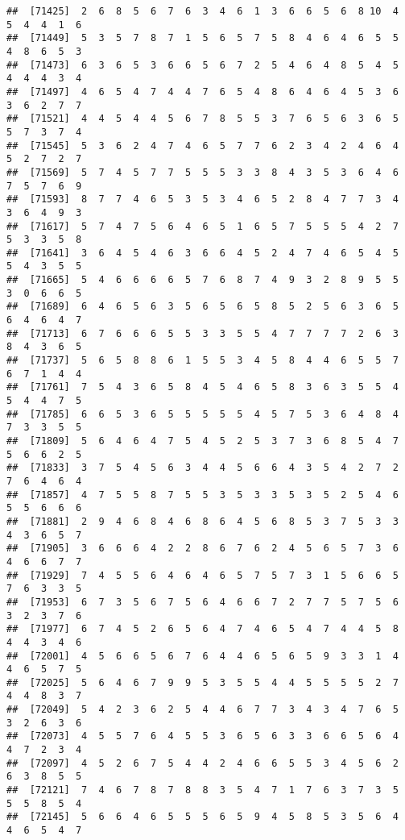 \documentclass[
]{book}
\begin{document}
\begin{verbatim}
##  [71425]  2  6  8  5  6  7  6  3  4  6  1  3  6  6  5  6  8 10  4  5  4  4  1  6
##  [71449]  5  3  5  7  8  7  1  5  6  5  7  5  8  4  6  4  6  5  5  4  8  6  5  3
##  [71473]  6  3  6  5  3  6  6  5  6  7  2  5  4  6  4  8  5  4  5  4  4  4  3  4
##  [71497]  4  6  5  4  7  4  4  7  6  5  4  8  6  4  6  4  5  3  6  3  6  2  7  7
##  [71521]  4  4  5  4  4  5  6  7  8  5  5  3  7  6  5  6  3  6  5  5  7  3  7  4
##  [71545]  5  3  6  2  4  7  4  6  5  7  7  6  2  3  4  2  4  6  4  5  2  7  2  7
##  [71569]  5  7  4  5  7  7  5  5  5  3  3  8  4  3  5  3  6  4  6  7  5  7  6  9
##  [71593]  8  7  7  4  6  5  3  5  3  4  6  5  2  8  4  7  7  3  4  3  6  4  9  3
##  [71617]  5  7  4  7  5  6  4  6  5  1  6  5  7  5  5  5  4  2  7  5  3  3  5  8
##  [71641]  3  6  4  5  4  6  3  6  6  4  5  2  4  7  4  6  5  4  5  5  4  3  5  5
##  [71665]  5  4  6  6  6  6  5  7  6  8  7  4  9  3  2  8  9  5  5  3  0  6  6  5
##  [71689]  6  4  6  5  6  3  5  6  5  6  5  8  5  2  5  6  3  6  5  6  4  6  4  7
##  [71713]  6  7  6  6  6  5  5  3  3  5  5  4  7  7  7  7  2  6  3  8  4  3  6  5
##  [71737]  5  6  5  8  8  6  1  5  5  3  4  5  8  4  4  6  5  5  7  6  7  1  4  4
##  [71761]  7  5  4  3  6  5  8  4  5  4  6  5  8  3  6  3  5  5  4  5  4  4  7  5
##  [71785]  6  6  5  3  6  5  5  5  5  5  4  5  7  5  3  6  4  8  4  7  3  3  5  5
##  [71809]  5  6  4  6  4  7  5  4  5  2  5  3  7  3  6  8  5  4  7  5  6  6  2  5
##  [71833]  3  7  5  4  5  6  3  4  4  5  6  6  4  3  5  4  2  7  2  7  6  4  6  4
##  [71857]  4  7  5  5  8  7  5  5  3  5  3  3  5  3  5  2  5  4  6  5  5  6  6  6
##  [71881]  2  9  4  6  8  4  6  8  6  4  5  6  8  5  3  7  5  3  3  4  3  6  5  7
##  [71905]  3  6  6  6  4  2  2  8  6  7  6  2  4  5  6  5  7  3  6  4  6  6  7  7
##  [71929]  7  4  5  5  6  4  6  4  6  5  7  5  7  3  1  5  6  6  5  7  6  3  3  5
##  [71953]  6  7  3  5  6  7  5  6  4  6  6  7  2  7  7  5  7  5  6  3  2  3  7  6
##  [71977]  6  7  4  5  2  6  5  6  4  7  4  6  5  4  7  4  4  5  8  4  4  3  4  6
##  [72001]  4  5  6  6  5  6  7  6  4  4  6  5  6  5  9  3  3  1  4  4  6  5  7  5
##  [72025]  5  6  4  6  7  9  9  5  3  5  5  4  4  5  5  5  5  2  7  4  4  8  3  7
##  [72049]  5  4  2  3  6  2  5  4  4  6  7  7  3  4  3  4  7  6  5  3  2  6  3  6
##  [72073]  4  5  5  7  6  4  5  5  3  6  5  6  3  3  6  6  5  6  4  4  7  2  3  4
##  [72097]  4  5  2  6  7  5  4  4  2  4  6  6  5  5  3  4  5  6  2  6  3  8  5  5
##  [72121]  7  4  6  7  8  7  8  8  3  5  4  7  1  7  6  3  7  3  5  5  5  8  5  4
##  [72145]  5  6  6  4  6  5  5  5  6  5  9  4  5  8  5  3  5  6  4  4  6  5  4  7

\end{verbatim}
\end{document}
